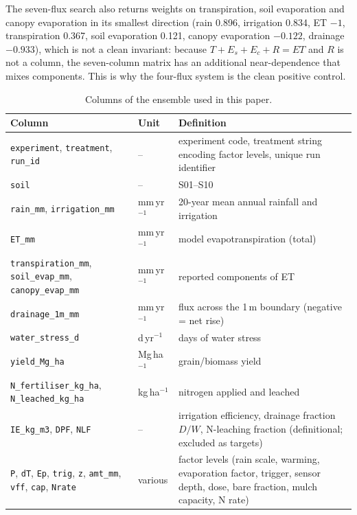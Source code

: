 The seven-flux search also returns weights on transpiration, soil evaporation and canopy evaporation in its smallest direction (rain 0.896, irrigation 0.834, ET $-1$, transpiration 0.367, soil evaporation 0.121, canopy evaporation $-0.122$, drainage $-0.933$), which is not a clean invariant: because $T+E_s+E_c+R=\mathit{ET}$ and $R$ is not a column, the seven-column matrix has an additional near-dependence that mixes components. This is why the four-flux system is the clean positive control.

\begin{table}[H]\centering\small
\caption{Columns of the ensemble used in this paper.}
\begin{tabularx}{\textwidth}{llX}
\toprule
Column & Unit & Definition\\\midrule
\texttt{experiment}, \texttt{treatment}, \texttt{run\_id} & -- & experiment code, treatment string encoding factor levels, unique run identifier\\
\texttt{soil} & -- & S01--S10\\
\texttt{rain\_mm}, \texttt{irrigation\_mm} & mm\,yr$^{-1}$ & 20-year mean annual rainfall and irrigation\\
\texttt{ET\_mm} & mm\,yr$^{-1}$ & model evapotranspiration (total)\\
\texttt{transpiration\_mm}, \texttt{soil\_evap\_mm}, \texttt{canopy\_evap\_mm} & mm\,yr$^{-1}$ & reported components of ET\\
\texttt{drainage\_1m\_mm} & mm\,yr$^{-1}$ & flux across the 1\,m boundary (negative = net rise)\\
\texttt{water\_stress\_d} & d\,yr$^{-1}$ & days of water stress\\
\texttt{yield\_Mg\_ha} & Mg\,ha$^{-1}$ & grain/biomass yield\\
\texttt{N\_fertiliser\_kg\_ha}, \texttt{N\_leached\_kg\_ha} & kg\,ha$^{-1}$ & nitrogen applied and leached\\
\texttt{IE\_kg\_m3}, \texttt{DPF}, \texttt{NLF} & -- & irrigation efficiency, drainage fraction $D/W$, N-leaching fraction (definitional; excluded as targets)\\
\texttt{P}, \texttt{dT}, \texttt{Ep}, \texttt{trig}, \texttt{z}, \texttt{amt\_mm}, \texttt{vff}, \texttt{cap}, \texttt{Nrate} & various & factor levels (rain scale, warming, evaporation factor, trigger, sensor depth, dose, bare fraction, mulch capacity, N rate)\\
\bottomrule
\end{tabularx}
\end{table}

